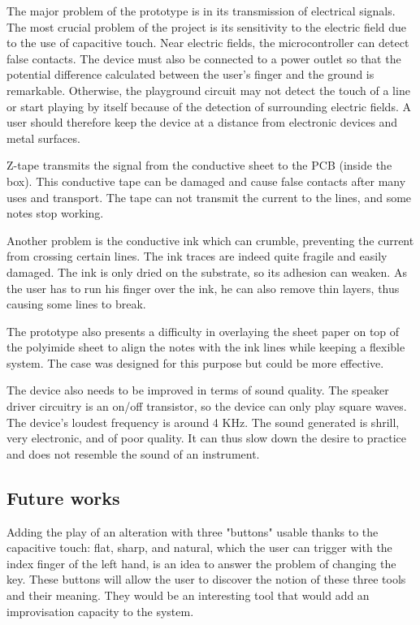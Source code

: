 The major problem of the prototype is in its transmission of electrical signals.
The most crucial problem of the project is its sensitivity to the electric field due to the use of capacitive touch. Near electric fields, the microcontroller can detect false contacts. The device must also be connected to a power outlet so that the potential difference calculated between the user's finger and the ground is remarkable. Otherwise, the playground circuit may not detect the touch of a line or start playing by itself because of the detection of surrounding electric fields. A user should therefore keep the device at a distance from electronic devices and metal surfaces.

Z-tape transmits the signal from the conductive sheet to the PCB (inside the box). This conductive tape can be damaged and cause false contacts after many uses and transport. The tape can not transmit the current to the lines, and some notes stop working.

Another problem is the conductive ink which can crumble, preventing the current from crossing certain lines. The ink traces are indeed quite fragile and easily damaged. The ink is only dried on the substrate, so its adhesion can weaken. As the user has to run his finger over the ink, he can also remove thin layers, thus causing some lines to break.

The prototype also presents a difficulty in overlaying the sheet paper on top of the polyimide sheet to align the notes with the ink lines while keeping a flexible system. The case was designed for this purpose but could be more effective.

The device also needs to be improved in terms of sound quality.
The speaker driver circuitry is an on/off transistor, so the device can only play square waves. The device's loudest frequency is around 4 KHz. The sound generated is shrill, very electronic, and of poor quality. It can thus slow down the desire to practice and does not resemble the sound of an instrument.

\subsection{Future works}

Adding the play of an alteration with three "buttons" usable thanks to the capacitive touch: flat, sharp, and natural, which the user can trigger with the index finger of the left hand, is an idea to answer the problem of changing the key. These buttons will allow the user to discover the notion of these three tools and their meaning. They would be an interesting tool that would add an improvisation capacity to the system.

